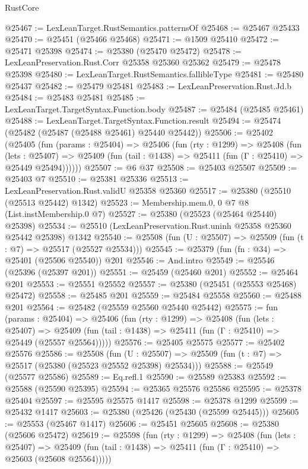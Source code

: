 \begin{lexlean}{RustCore}
\begin{coremodule}
@25467 := LexLeanTarget.RustSemantics.patternsOf
@25468 := @25467 @25433
@25470 := @25451 (@25466 @25468)
@25471 := @1509 @25410
@25472 := @25471 @25398
@25474 := @25380 (@25470 @25472)
@25478 := LexLeanPreservation.Rust.Corr @25358 @25360 @25362
@25479 := @25478 @25398
@25480 := LexLeanTarget.RustSemantics.fallibleType
@25481 := @25480 @25437
@25482 := @25479 @25481
@25483 := LexLeanPreservation.Rust.Jd.b
@25484 := @25483 @25481
@25485 := LexLeanTarget.TargetSyntax.Function.body
@25487 := @25484 (@25485 @25461)
@25488 := LexLeanTarget.TargetSyntax.Function.result
@25494 := @25474 (@25482 (@25487 (@25488 @25461) @25440 @25442))
@25506 := @25402
    (@25405
      (fun (params : @25404) =>
      @25406
        (fun (rty : @1299) =>
        @25408
          (fun (lets : @25407) =>
          @25409 (fun (tail : @1438) => @25411 (fun (Γ : @25410) => @25449 @25494))))))
@25507 := @6 @37
@25508 := @25403 @25507
@25509 := @25403 @7
@25510 := @25381 @25336
@25513 := LexLeanPreservation.Rust.validU @25358 @25360
@25517 := @25380 (@25510 (@25513 @25442) @1342)
@25523 := Membership.mem.{0, 0} @7 @8 (List.instMembership.{0} @7)
@25527 := @25380 (@25523 (@25464 @25440) @25398)
@25534 := @25510 (LexLeanPreservation.Rust.uninh @25358 @25360 @25442 @25398) @1342
@25540 := @25508 (fun (U : @25507) => @25509 (fun (t : @7) => @25517 (@25527 @25534)))
@25545 := @25379 (fun (fn : @34) => @25401 (@25506 @25540)) @201
@25546 := And.intro
@25549 := @25546 (@25396 (@25397 @201))
@25551 := @25459 (@25460 @201)
@25552 := @25464 @201
@25553 := @25551 @25552
@25557 := @25380 (@25451 (@25553 @25468) @25472)
@25558 := @25485 @201
@25559 := @25484 @25558
@25560 := @25488 @201
@25564 := @25482 (@25559 @25560 @25440 @25442)
@25575 := fun (params : @25404) =>
  @25406
    (fun (rty : @1299) =>
    @25408
      (fun (lets : @25407) =>
      @25409 (fun (tail : @1438) => @25411 (fun (Γ : @25410) => @25449 (@25557 @25564)))))
@25576 := @25405 @25575
@25577 := @25402 @25576
@25586 := @25508
    (fun (U : @25507) => @25509 (fun (t : @7) => @25517 (@25380 (@25523 @25552 @25398) @25534)))
@25588 := @25549 (@25577 @25586)
@25589 := Eq.refl.{1}
@25590 := @25589 @25383
@25592 := @25588 (@25590 @25395)
@25594 := @25365 @25576 @25586
@25595 := @25378 @25404
@25597 := @25595 @25575 @1417
@25598 := @25378 @1299
@25599 := @25432 @1417
@25603 := @25380 (@25426 (@25430 (@25599 @25445)))
@25605 := @25553 (@25467 @1417)
@25606 := @25451 @25605
@25608 := @25380 (@25606 @25472)
@25619 := @25598
    (fun (rty : @1299) =>
    @25408
      (fun (lets : @25407) =>
      @25409 (fun (tail : @1438) => @25411 (fun (Γ : @25410) => @25603 (@25608 @25564)))))

\end{coremodule}
\end{lexlean}
